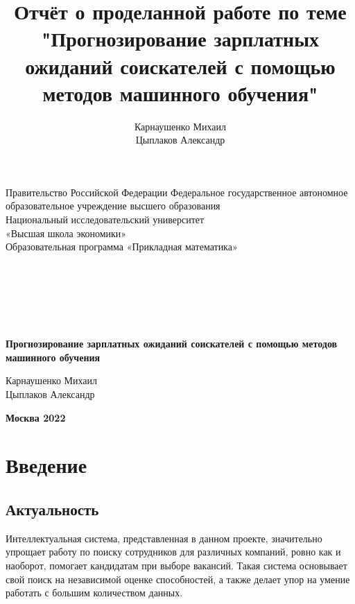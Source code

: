 \documentclass{article}
\title{Отчёт о проделанной работе по теме "Прогнозирование зарплатных ожиданий соискателей с помощью методов машинного обучения"}
\author{Карнаушенко Михаил \\ Цыплаков Александр}
\begin{document}
\pagecolor{white}
%
\begin{center}
\noindent Правительство Российской Федерации Федеральное государственное автономное образовательное учреждение высшего образования\\

Национальный исследовательский университет\\
«Высшая школа экономики»\bigskip\\

Образовательная программа «Прикладная математика»\\
\vfill
\bigskip
\bigskip
\begin{Large} \\
\\
\end{Large}
\\
\\
\bigskip
\begin{Large}
\textbf{Прогнозирование зарплатных ожиданий соискателей с помощью методов машинного обучения}
\end{Large}
\vfill
\vfill
\begin{flushright}

Карнаушенко Михаил\\
Цыплаков Александр\bigskip\\
                       

\end{flushright}
\vfill
\begin{center}
\textbf{Москва 2022}
\end{center}

\end{center}
\pagebreak


\maketitle







\section{Введение}

\subsection{Актуальность}
Интеллектуальная система, представленная в данном проекте, значительно упрощает работу по поиску сотрудников для различных компаний, ровно как и наоборот, помогает кандидатам при выборе вакансий. Такая система основывает свой поиск на независимой оценке способностей, а также делает упор на умение работать с большим количеством данных. 
\end{document}
